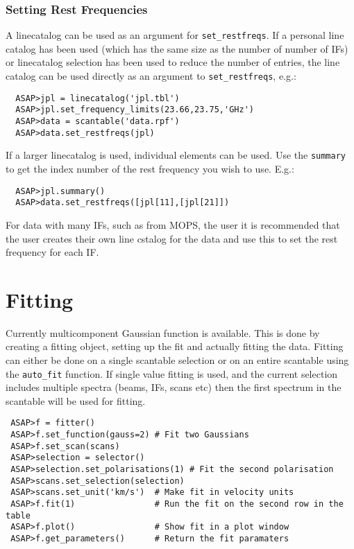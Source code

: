 \documentclass[11pt]{article}
\newcommand{\cmd}[1]{{\tt #1}}
\begin{document}
\subsubsection{Setting Rest Frequencies}

A linecatalog can be used as an
argument for \cmd{set\_restfreqs}. If a personal line catalog has been
used (which has the same size as the number of number of IFs) or
linecatalog selection has been used to reduce the number of entries,
the line catalog can be used directly as an argument to
\cmd{set\_restfreqs}, e.g.:
\begin{verbatim}
  ASAP>jpl = linecatalog('jpl.tbl')
  ASAP>jpl.set_frequency_limits(23.66,23.75,'GHz')
  ASAP>data = scantable('data.rpf')
  ASAP>data.set_restfreqs(jpl)
\end{verbatim}

If a larger linecatalog is used, individual elements can be used. Use
the \cmd{summary} to get the index number of the rest frequency you
wish to use. E.g.:

\begin{verbatim}
  ASAP>jpl.summary()
  ASAP>data.set_restfreqs([jpl[11],[jpl[21]])
\end{verbatim}

For data with many IFs, such as from MOPS, the user it is recommended
that the user creates their own line cstalog for the data and use this
to set the rest frequency for each IF.

\section{Fitting}

Currently multicomponent Gaussian function is
available. This is done by creating a fitting object, setting up the
fit and actually fitting the data. Fitting can either be done on a
single scantable selection or on an entire scantable using the
\cmd{auto\_fit} function. If single value fitting is used, and the
current selection includes multiple spectra (beams, IFs, scans etc)
then the first spectrum in the scantable will be used for fitting.

\begin{verbatim}
 ASAP>f = fitter()
 ASAP>f.set_function(gauss=2) # Fit two Gaussians
 ASAP>f.set_scan(scans)
 ASAP>selection = selector()
 ASAP>selection.set_polarisations(1) # Fit the second polarisation
 ASAP>scans.set_selection(selection)
 ASAP>scans.set_unit('km/s')  # Make fit in velocity units
 ASAP>f.fit(1)                # Run the fit on the second row in the table
 ASAP>f.plot()                # Show fit in a plot window
 ASAP>f.get_parameters()      # Return the fit paramaters
\end{verbatim}
\end{document}
